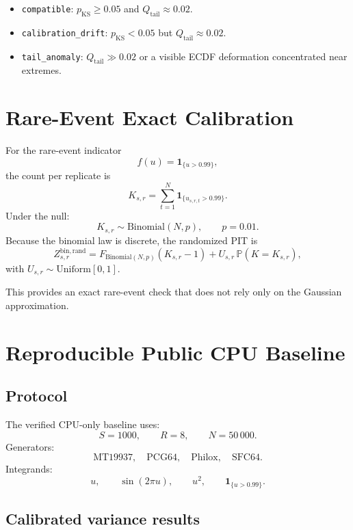 \documentclass[11pt,a4paper]{article}
\newcommand{\Bin}{\mathrm{Binomial}}
\newcommand{\Unif}{\mathrm{Uniform}}
\newcommand{\Qtail}{Q_{\mathrm{tail}}}
\newcommand{\KS}{\mathrm{KS}}
\begin{document}
\begin{itemize}
  \item \texttt{compatible}: $p_{\KS}\geq0.05$ and $\Qtail\approx0.02$.
  \item \texttt{calibration\_drift}: $p_{\KS}<0.05$ but $\Qtail\approx0.02$.
  \item \texttt{tail\_anomaly}: $\Qtail\gg0.02$ or a visible ECDF deformation concentrated near extremes.
\end{itemize}

\section{Rare-Event Exact Calibration}

For the rare-event indicator
\[
f(u)=\mathbf 1_{\{u>0.99\}},
\]
the count per replicate is
\[
K_{s,r}=\sum_{t=1}^{N}\mathbf 1_{\{u_{s,r,t}>0.99\}}.
\]
Under the null:
\[
K_{s,r}\sim\Bin(N,p),
\qquad p=0.01.
\]
Because the binomial law is discrete, the randomized PIT is
\[
Z^{\mathrm{bin,rand}}_{s,r}
=
F_{\Bin(N,p)}(K_{s,r}-1)
+
U_{s,r}\,\mathbb P(K=K_{s,r}),
\]
with $U_{s,r}\sim\Unif[0,1]$.

This provides an exact rare-event check that does not rely only on the Gaussian approximation.

\section{Reproducible Public CPU Baseline}

\subsection{Protocol}

The verified CPU-only baseline uses:
\[
S=1000,\qquad R=8,\qquad N=50\,000.
\]
Generators:
\[
\text{MT19937},\quad \text{PCG64},\quad \text{Philox},\quad \text{SFC64}.
\]
Integrands:
\[
u,\qquad
\sin(2\pi u),\qquad
u^2,\qquad
\mathbf 1_{\{u>0.99\}}.
\]

\subsection{Calibrated variance results}
\end{document}
